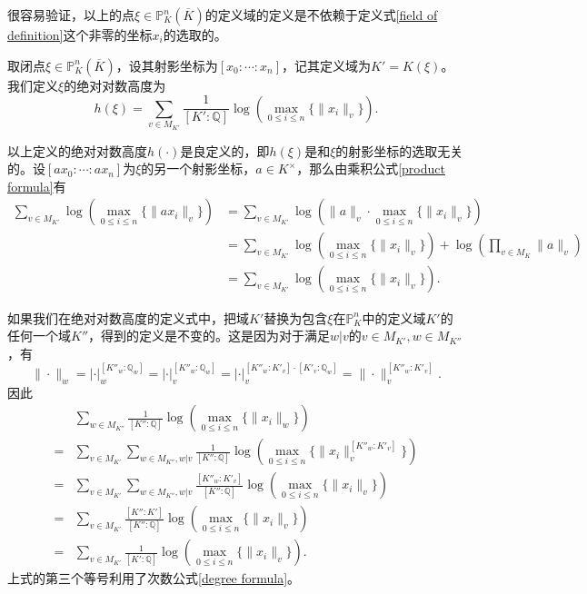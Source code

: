 很容易验证，以上的点$\xi\in\mathbb{P}^n_K(\overline K)$的定义域的定义是不依赖于定义式\eqref{field of definition}这个非零的坐标$x_i$的选取的。

\begin{definition} \label{abs log height}
取闭点$\xi\in\mathbb{P}^n_K(\overline{K})$，设其射影坐标为$[x_0:\cdots:x_n]$，记其定义域为$K'=K(\xi)$。我们定义$\xi$的绝对对数高度为
\begin{equation} \label{eq: abs log height}
h(\xi) = \sum_{v\in M_{K'}} \frac{1}{[K':\mathbb{Q}]} \log \left( \max_{0\leqslant i\leqslant n} \{\|x_i\|_v\} \right).
\end{equation}
\end{definition}

\begin{remark}
以上定义的绝对对数高度$h(\cdot)$是良定义的，即$h(\xi)$是和$\xi$的射影坐标的选取无关的。设$[ax_0:\cdots:ax_n]$为$\xi$的另一个射影坐标，$a\in K^\times$，那么由乘积公式\eqref{product formula}有
\begin{align}
\sum_{v\in M_{K'}} \log\left(\max_{0\leqslant i\leqslant n}\{\|ax_i\|_v\}\right) & = \sum_{v\in M_{K'}} \log\left(\|a\|_v\cdot\max_{0\leqslant i\leqslant n}\{\|x_i\|_v\}\right) \\
& = \sum_{v\in M_{K'}} \log\left(\max_{0\leqslant i\leqslant n}\{\|x_i\|_v\}\right) + \log\left(\prod\limits_{v\in M_K} \|a\|_v\right) \\
& = \sum_{v\in M_{K'}} \log\left(\max_{0\leqslant i\leqslant n}\{\|x_i\|_v\}\right).
\end{align}

如果我们在绝对对数高度的定义式中，把域$K'$替换为包含$\xi$在$\mathbb{P}^n_K$中的定义域$K'$的任何一个域$K''$，得到的定义是不变的。这是因为对于满足$w|v$的$v\in M_{K'}, w\in M_{K''}$，有
\begin{equation}
\|\cdot\|_w = |\cdot|_w^{[K''_w:\mathbb{Q}_w]} = |\cdot|_v^{[K''_w:\mathbb{Q}_w]} = |\cdot|_v^{[K''_w:K'_v]\cdot[K'_v:\mathbb{Q}_w]} = \|\cdot\|_v^{[K''_w:K'_v]}.
\end{equation}
因此
\begin{align}
& \sum_{w\in M_{K''}} \frac{1}{[K'':\mathbb{Q}]} \log\left(\max_{0\leqslant i\leqslant n}\{\|x_i\|_w\}\right) \nonumber \\
= & \sum_{v\in M_{K'}} \sum_{w\in M_{K''}, w|v} \frac{1}{[K'':\mathbb{Q}]} \log\left(\max_{0\leqslant i\leqslant n}\{\|x_i\|_v^{[K''_w:K'_v]}\}\right) \\
= & \sum_{v\in M_{K'}} \sum_{w\in M_{K''}, w|v} \frac{[K''_w:K'_v]}{[K'':\mathbb{Q}]} \log\left(\max_{0\leqslant i\leqslant n}\{\|x_i\|_v\}\right) \\
= & \sum_{v\in M_{K'}} \frac{[K'':K']}{[K'':\mathbb{Q}]} \log\left(\max_{0\leqslant i\leqslant n}\{\|x_i\|_v\}\right) \\
= & \sum_{v\in M_{K'}} \frac{1}{[K':\mathbb{Q}]} \log\left(\max_{0\leqslant i\leqslant n}\{\|x_i\|_v\}\right).
\end{align}
上式的第三个等号利用了次数公式\eqref{degree formula}。
\end{remark}

